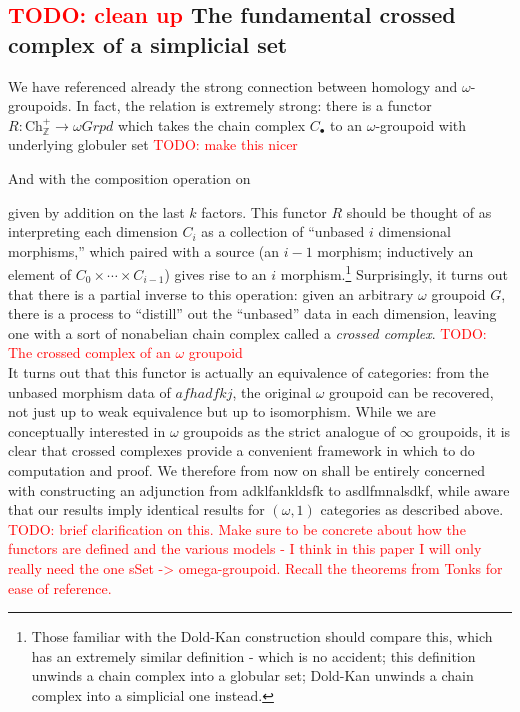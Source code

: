 \documentclass[12pt]{article}
\theoremstyle{definition}
\newcommand{\TODO}[1]{\textcolor{red}{TODO: {#1}}}
\newcommand{\ch}{\text{Ch}_\mathbb{Z}^+}
\begin{document}
\subsection{\TODO{clean up} The fundamental crossed complex of a simplicial set}
	We have referenced already the strong connection between homology and $\omega$-groupoids. In fact, the relation is extremely strong: there is a functor $R: \ch \to \omega Grpd$ which takes the chain complex $C_\bullet$ to an $\omega$-groupoid with underlying globuler set
	\TODO{make this nicer}
	\begin{center}
	\end{center}
	And with the composition operation on
	\begin{center}
	\end{center}
	given by addition on the last $k$ factors. This functor $R$ should be thought of as interpreting each dimension $C_i$ as a collection of ``unbased $i$ dimensional morphisms,'' which paired with a source (an $i-1$ morphism; inductively an element of $C_0 \times \cdots \times C_{i-1}$) gives rise to an $i$ morphism.\footnote{Those familiar with the Dold-Kan construction should compare this, which has an extremely similar definition - which is no accident; this definition unwinds a chain complex into a globular set; Dold-Kan unwinds a chain complex into a simplicial one instead.} Surprisingly, it turns out that there is a partial inverse to this operation: given an arbitrary $\omega$ groupoid $G$, there is a process to ``distill'' out the ``unbased'' data in each dimension, leaving one with a sort of nonabelian chain complex called a \textit{crossed complex}.
	\TODO{The crossed complex of an $\omega$ groupoid} \\
	It turns out that this functor is actually an equivalence of categories: from the unbased morphism data of $afhadfkj$, the original $\omega$ groupoid can be recovered, not just up to weak equivalence but up to isomorphism. While we are conceptually interested in $\omega$ groupoids as the strict analogue of $\infty$ groupoids, it is clear that crossed complexes provide a convenient framework in which to do computation and proof. We therefore from now on shall be entirely concerned with constructing an adjunction from adklfankldsfk to asdlfmnalsdkf, while aware that our results imply identical results for $(\omega,1)$ categories as described above. 
	\TODO{brief clarification on this. Make sure to be concrete about how the functors are defined and the various models - I think in this paper I will only really need the one sSet -> omega-groupoid. Recall the theorems from Tonks for ease of reference.} 
	
\end{document}
